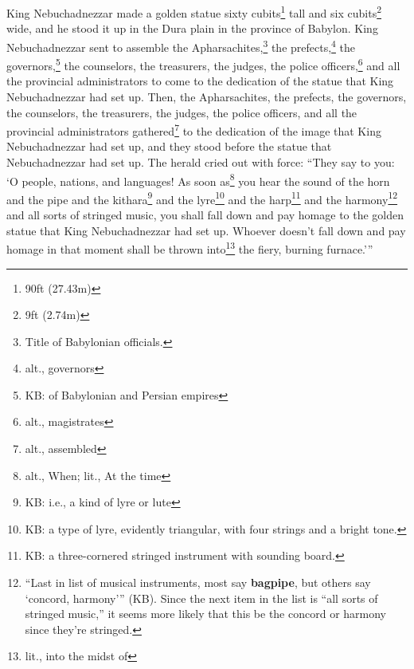 
\begin{inparaenum}
     King Nebuchadnezzar made a golden statue sixty cubits\footnote{90\thinspace ft (27.43\thinspace m)} tall and six cubits\footnote{9\thinspace ft (2.74\thinspace m)} wide, and he stood it up in the Dura plain in the province of Babylon.%
     King Nebuchadnezzar sent to assemble the Apharsachites,\footnote{Title of Babylonian officials.} the prefects,\footnote{alt., governors} the governors,\footnote{KB: of Babylonian and Persian empires} the counselors, the treasurers, the judges, the police officers,\footnote{alt., magistrates} and all the provincial administrators to come to the dedication of the statue that King Nebuchadnezzar had set up.%
     Then, the Apharsachites, the prefects, the governors, the counselors, the treasurers, the judges, the police officers, and all the provincial administrators gathered\footnote{alt., assembled} to the dedication of the image that King Nebuchadnezzar had set up, and they stood before the statue that Nebuchadnezzar had set up.%
     The herald cried out with force: ``They say to you: `O people, nations, and languages!%
     As soon as\footnote{alt., When; lit., At the time} you hear the sound of the horn and the pipe and the kithara\footnote{KB: i.e., a kind of lyre or lute} and the lyre\footnote{KB: a type of lyre, evidently triangular, with four strings and a bright tone.} and the harp\footnote{KB: a three-cornered stringed instrument with sounding board.} and the harmony\footnote{``Last in list of musical instruments, most say \textbf{bagpipe}, but others say `concord, harmony'\thinspace'' (KB). Since the next item in the list is ``all sorts of stringed music,'' it seems more likely that this be the concord or harmony since they're stringed.} and all sorts of stringed music, you shall fall down and pay homage to the golden statue that King Nebuchadnezzar had set up.%
     Whoever doesn't fall down and pay homage in that moment shall be thrown into\footnote{lit., into the midst of} the fiery, burning furnace.'\thinspace''%
    

\end{inparaenum}
